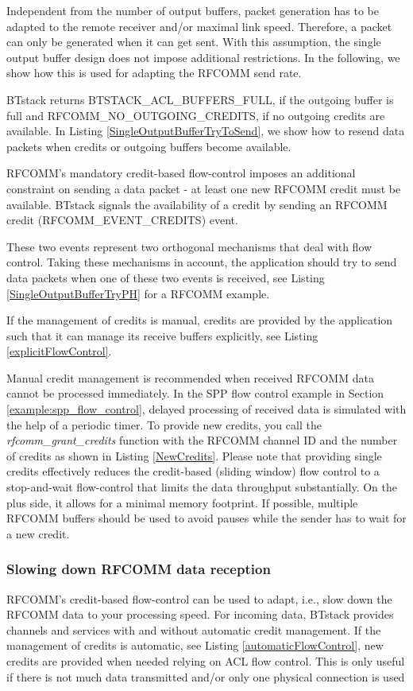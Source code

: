 Independent from the number of output buffers, packet generation has to be adapted to the remote receiver and/or maximal link speed. Therefore, a packet can only be generated when it can get sent. With this assumption, the single output buffer design does not impose additional restrictions. In the following, we show how this is used for adapting the RFCOMM send rate. 

BTstack returns BTSTACK\_ACL\_BUFFERS\_FULL, if the outgoing buffer is full and RFCOMM\_NO\_OUTGOING\_CREDITS, if no outgoing credits are available. In Listing \ref{SingleOutputBufferTryToSend}, we show how to resend data packets when credits or outgoing buffers become available.


RFCOMM's mandatory credit-based flow-control imposes an additional constraint on sending a data packet - at least one new RFCOMM credit must be available. BTstack signals the availability of a credit by sending an RFCOMM credit (RFCOMM\_EVENT\_CREDITS) event. 

These two events represent two orthogonal mechanisms that deal with flow control. Taking these mechanisms in account, the application should try to send data packets when one of these two events is received, see Listing \ref{SingleOutputBufferTryPH} for a RFCOMM example.


If the management of credits is manual, credits are provided by the application such that it can manage its receive buffers explicitly, see Listing \ref{explicitFlowControl}.

Manual credit management is recommended when received RFCOMM data cannot be processed immediately. In the SPP flow control example in Section \ref{example:spp_flow_control}, delayed processing of received data is simulated with the help of a periodic timer. To provide new credits, you call the \emph{rfcomm\_grant\_credits} function with the RFCOMM channel ID and the number of credits as shown in Listing \ref{NewCredits}.
Please note that providing single credits effectively reduces the credit-based (sliding window) flow control to a stop-and-wait flow-control that limits the data throughput substantially. On the plus side, it allows for a minimal memory footprint. If possible, multiple RFCOMM buffers should be used to avoid pauses while the sender has to wait for a new credit.


\subsubsection{Slowing down RFCOMM data reception}
\label{sec:manualCredits}
RFCOMM's credit-based flow-control can be used to adapt, i.e., slow down the RFCOMM data to your processing speed. 
For incoming data, BTstack provides channels and services with and without automatic credit management. 
If the management of credits is automatic, see Listing \ref{automaticFlowControl},  new credits are provided when needed relying on ACL flow control. This is only useful if there is not much data transmitted and/or only one physical connection is used


